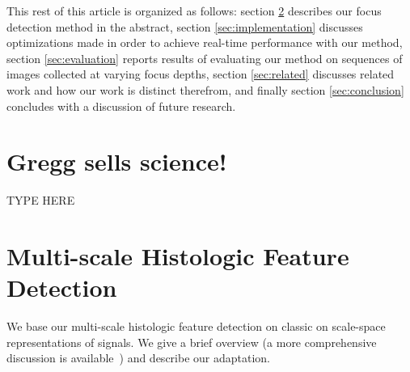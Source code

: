 \documentclass[sigconf,nonacm]{acmart}
\begin{document}
This rest of this article is organized as follows: section \ref{sec:mhd} describes our focus detection method in the abstract, section \ref{sec:implementation} discusses optimizations made in order to achieve real-time performance with our method, section \ref{sec:evaluation} reports results of evaluating our method on sequences of images collected at varying focus depths, section \ref{sec:related} discusses related work and how our work is distinct therefrom, and finally section \ref{sec:conclusion} concludes with a discussion of future research.

\section{Gregg sells science!}

TYPE HERE

\section{Multi-scale Histologic Feature Detection}\label{sec:mhd}

We base our multi-scale histologic feature detection on classic on scale-space representations of signals. 
We give a brief overview (a more comprehensive discussion is available~\cite{}) and describe our adaptation.
\end{document}
